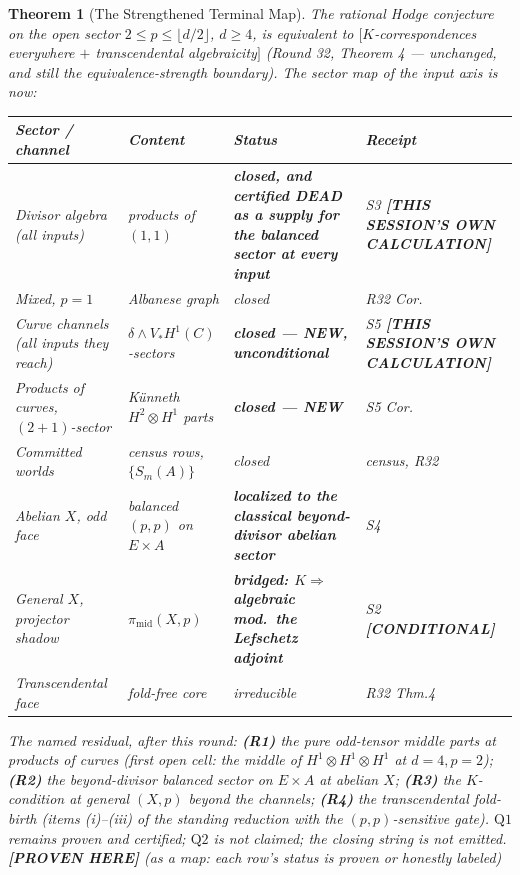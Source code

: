 \documentclass[11pt]{article}
\newtheorem{theorem}{Theorem}
\newcommand{\PROVEN}{\textbf{[PROVEN HERE]}}
\newcommand{\COND}{\textbf{[CONDITIONAL]}}
\newcommand{\MINE}{\textbf{[THIS SESSION'S OWN CALCULATION]}}
\begin{document}
\begin{theorem}[The Strengthened Terminal Map]\label{thm:s6}
The rational Hodge conjecture on the open sector
$2\le p\le\lfloor d/2\rfloor$, $d\ge4$, is equivalent to
$[$$K$-correspondences everywhere $+$ transcendental algebraicity$]$
(Round 32, Theorem 4 --- unchanged, and still the equivalence-strength
boundary). The sector map of the input axis is now:
\begin{center}
\small
\begin{tabular}{@{}p{4.1cm}p{4.3cm}p{3.2cm}p{3.2cm}@{}}
\toprule
\textbf{Sector / channel} & \textbf{Content} & \textbf{Status} & \textbf{Receipt} \\
\midrule
Divisor algebra (all inputs) & products of $(1,1)$ & \textbf{closed, and certified DEAD as a supply for the balanced sector at every input} & S3 \MINE{} \\
Mixed, $p=1$ & Albanese graph & closed & R32 Cor. \\
Curve channels (all inputs they reach) & $\delta\wedge V_{*}H^{1}(C)$-sectors & \textbf{closed --- NEW, unconditional} & S5 \MINE{} \\
Products of curves, $(2{+}1)$-sector & Künneth $H^{2}\otimes H^{1}$ parts & \textbf{closed --- NEW} & S5 Cor. \\
Committed worlds & census rows, $\{S_m(A)\}$ & closed & census, R32 \\
Abelian $X$, odd face & balanced $(p,p)$ on $E\times A$ & \textbf{localized to the classical beyond-divisor abelian sector} & S4 \\
General $X$, projector shadow & $\pi_{\mathrm{mid}}(X,p)$ & \textbf{bridged: $K\Rightarrow$ algebraic mod.\ the Lefschetz adjoint} & S2 \COND{} \\
Transcendental face & fold-free core & irreducible & R32 Thm.4 \\
\bottomrule
\end{tabular}
\end{center}
The named residual, after this round: \textbf{(R1)} the pure odd-tensor
middle parts at products of curves (first open cell: the middle of
$H^{1}\otimes H^{1}\otimes H^{1}$ at $d=4,p=2$); \textbf{(R2)} the
beyond-divisor balanced sector on $E\times A$ at abelian $X$; \textbf{(R3)}
the $K$-condition at general $(X,p)$ beyond the channels; \textbf{(R4)} the
transcendental fold-birth (items (i)--(iii) of the standing reduction with
the $(p,p)$-sensitive gate). $\mathrm{Q1}$ remains proven and certified;
$\mathrm{Q2}$ is not claimed; the closing string is not emitted.
\PROVEN{} (as a map: each row's status is proven or honestly labeled)
\end{theorem}
\end{document}
